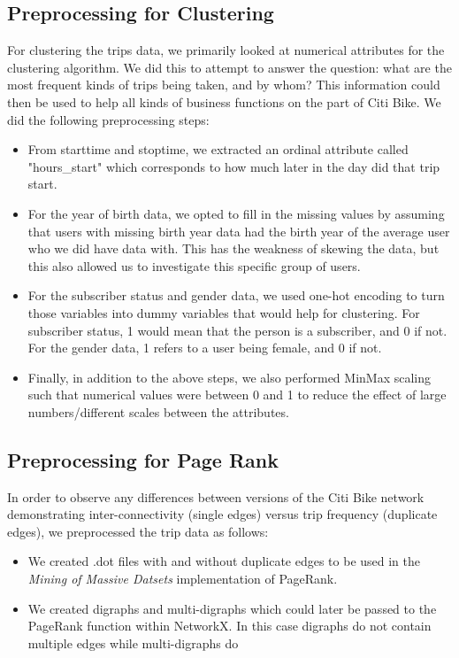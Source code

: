 \documentclass{article}
\begin{document}
\subsection{Preprocessing for Clustering}
For clustering the trips data, we primarily looked at numerical attributes for the clustering algorithm. We did this to attempt to answer the question: what are the most frequent kinds of trips being taken, and by whom? This information could then be used to help all kinds of business functions on the part of Citi Bike. 
\newline
We did the following preprocessing steps:
\begin{itemize}
    \item From starttime and stoptime, we extracted an ordinal attribute called "hours\_start" which corresponds to how much later in the day did that trip start.
    \item For the year of birth data, we opted to fill in the missing values by assuming that users with missing birth year data had the birth year of the average user who we did have data with. This has the weakness of skewing the data, but this also allowed us to investigate this specific group of users.
    \item For the subscriber status and gender data, we used one-hot encoding to turn those variables into dummy variables that would help for clustering. For subscriber status, 1 would mean that the person is a subscriber, and 0 if not. For the gender data, 1 refers to a user being female, and 0 if not.
    \item Finally, in addition to the above steps, we also performed MinMax scaling such that numerical values were between 0 and 1  to reduce the effect of large numbers/different scales between the attributes.
\end{itemize}
\subsection{Preprocessing for Page Rank}
In order to observe any differences between versions of the Citi Bike network demonstrating inter-connectivity (single edges) versus trip frequency (duplicate edges), we preprocessed the trip data as follows: 
\begin{itemize}
    \item We created .dot files with and without duplicate edges to be used in the \emph{Mining of Massive Datsets} implementation of PageRank.  
    \item We created digraphs and multi-digraphs which could later be passed to the PageRank function within NetworkX. In this case digraphs do not contain multiple edges while multi-digraphs do
\end{itemize}
\end{document}
